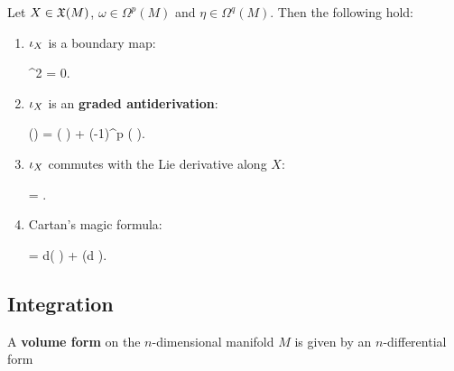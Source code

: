 \begin{property}
	Let $X \in \fields(M)$, $\omega \in \Omega^p(M)$ and $\eta \in \Omega^q(M)$. Then the following hold:
	\begin{enumerate}
		\item $\ipr{X}$ is a boundary map:
		\begin{eqalign}
			^2 = 0.
		\end{eqalign}
		\item $\ipr{X}$ is an \textbf{graded antiderivation}:
		\begin{eqalign}
		\label{eq:int_prod_graded_antid}
			(\omega \wedge \eta) = ( \omega) \wedge \eta + (-1)^p \omega \wedge (\ipr{X} \eta).
		\end{eqalign}
		\item $$ commutes with the Lie derivative along $X$:
		\begin{eqalign}
			 \ipr{X} =  \Lie{X}.
		\end{eqalign}
		\item Cartan's magic formula:
		\begin{eqalign}
		\label{eq:cartan_magic_formula}
			 \omega = d( \omega) +  (d \omega).
		\end{eqalign}
	\end{enumerate}
\end{property}

\subsection{Integration}
\begin{definition}
	A \textbf{volume form} on the $n$-dimensional manifold $M$ is given by an $n$-differential form
\end{definition}
